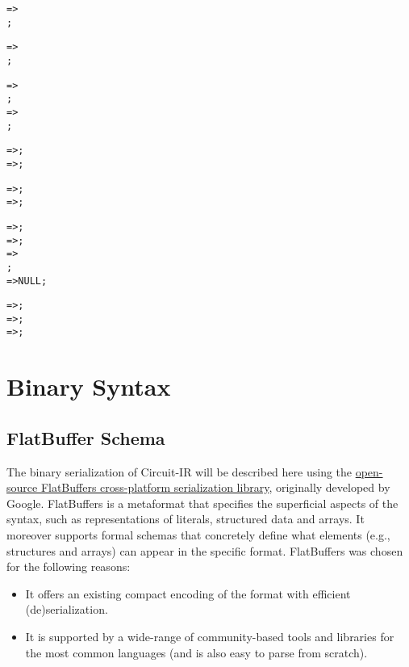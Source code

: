 \begin{appendices}
\begin{alltt}
 =>  \term{(}  \term{,}
     \term{:}  \term{)}
     \term{;} ;

 =>  \term{(}  \term{)}
     \term{;} ;

 =>  \term{(}  \term{,} 
    \term{,}   \term{)} ;
 =>  \term{(}  \term{,} 
     \term{)} ;

 =>   ;
 =>  ;

 =>  ;
 =>  ;

 => \term{,}  \term{:}  ;
 => \term{,}  \term{:}  ;
 => \term{,}  \term{:}  \term{,}
     \term{:}  ;
 => NULL ;

 =>  \term{,}  ;
 =>  ;
 =>  \term{:}  ;
\end{alltt}

\section{Binary Syntax}\label{binary_syntax}

\subsection{FlatBuffer Schema}
The binary serialization of Circuit-IR will be described here using the \href{https://google.github.io/flatbuffers/}{open-source FlatBuffers cross-platform serialization library}, originally developed by Google.
FlatBuffers is a metaformat that specifies the superficial aspects of the syntax, such as representations of literals, structured data and arrays.
It moreover supports formal schemas that concretely define what elements (e.g., structures and arrays) can appear in the specific format.
FlatBuffers was chosen for the following reasons:
\begin{itemize}
    \item It offers an existing compact encoding of the format with efficient (de)serialization.
    \item It is supported by a wide-range of community-based tools and libraries for the most common languages (and is also easy to parse from scratch).
\end{itemize}


\end{appendices}
